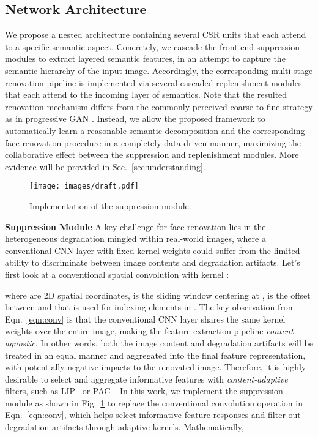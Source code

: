 \documentclass[sigconf]{acmart}
\begin{document}
\subsection{Network Architecture}
\label{sec:architecture}
We propose a nested architecture containing several CSR units that each attend to a specific semantic aspect. Concretely, we cascade the front-end suppression modules to extract layered semantic features, in an attempt to capture the semantic hierarchy of the input image. Accordingly, the corresponding multi-stage renovation pipeline is implemented via several cascaded replenishment modules that each attend to the incoming layer of semantics.
Note that the resulted renovation mechanism differs from the commonly-perceived coarse-to-fine strategy as in progressive GAN \cite{progressivegan}\cite{progressive-face-sr}. Instead, we allow the proposed framework to automatically learn a reasonable semantic decomposition and the corresponding face renovation procedure in a completely data-driven manner, maximizing the collaborative effect between the suppression and replenishment modules. More evidence will be provided in Sec.~\ref{sec:understanding}.

\begin{figure}[!tp]
	\centering
	\texttt{[image: images/draft.pdf]}
	\caption{Implementation of the suppression module.}\label{fig:draft}
\end{figure}

\textbf{Suppression Module}
A key challenge for face renovation lies in the heterogeneous degradation mingled within real-world images, where a conventional CNN layer with fixed kernel weights could suffer from the limited ability to discriminate between image contents and degradation artifacts. Let's first look at a conventional spatial convolution with kernel :



where  are 2D spatial coordinates,  is the sliding window centering at ,  is the offset between  and  that is used for indexing elements in . The key observation from Eqn.~\eqref{eqn:conv} is that the conventional CNN layer shares the same kernel weights over the entire image, making the feature extraction pipeline \emph{content-agnostic}. In other words, both the image content and degradation artifacts will be treated in an equal manner and aggregated into the final feature representation, with potentially negative impacts to the renovated image. Therefore, it is highly desirable to select and aggregate informative features with \emph{content-adaptive} filters, such as LIP~\cite{LIP} or PAC~\cite{PixelAdaptiveCNN}. In this work, we implement the suppression module as shown in Fig.~\ref{fig:draft} to replace the conventional convolution operation in Eqn.~\eqref{eqn:conv}, which helps select informative feature responses and filter out degradation artifacts through adaptive kernels. Mathematically,
\end{document}

